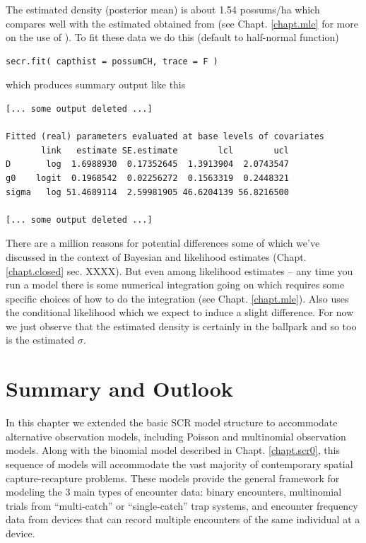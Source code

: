 The estimated density (posterior mean) is about 1.54 possums/ha which
compares well with the estimated obtained from \secr (see
Chapt. \ref{chapt.mle} for more on the use of \secr).
To fit these data we do this (default to half-normal function)
\begin{verbatim}
secr.fit( capthist = possumCH, trace = F )
\end{verbatim}
which produces summary output like this
\begin{verbatim}
[... some output deleted ...]

Fitted (real) parameters evaluated at base levels of covariates
       link   estimate SE.estimate        lcl        ucl
D       log  1.6988930  0.17352645  1.3913904  2.0743547
g0    logit  0.1968542  0.02256272  0.1563319  0.2448321
sigma   log 51.4689114  2.59981905 46.6204139 56.8216500

[... some output deleted ...]
\end{verbatim}
There are a million reasons for potential differences some of which
we've discussed in the context of Bayesian and likelihood estimates
(Chapt. \ref{chapt.closed} sec. XXXX).
But even among likelihood estimates -- any time you run a model there
is some numerical integration going on which requires some specific
choices of how to do the integration (see
Chapt. \ref{chapt.mle}). Also \secr uses the conditional likelihood
\citep{borchers_efford:2008} which we expect to induce a slight
difference.
For now we just observe that the estimated density is certainly in the
ballpark and so too is the estimated $\sigma$.






\section{Summary and Outlook}

In this chapter we extended the basic SCR model structure to
accommodate alternative observation models, including Poisson and
multinomial observation models.
Along with the binomial model described in Chapt. \ref{chapt.scr0},
this sequence of models will accommodate the vast majority of
contemporary spatial capture-recapture problems. These models provide
the general framework for modeling the 3 main types of encounter data:
binary encounters, multinomial trials from ``multi-catch'' or
``single-catch'' \citep{efford:2004, efford:2011} trap systems, and encounter frequency
data from devices that can record multiple encounters of the same
individual at a device.


